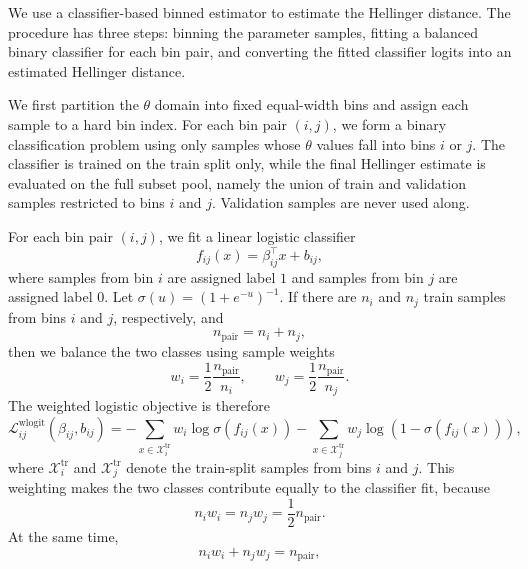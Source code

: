 We use a classifier-based binned estimator to estimate the Hellinger distance. The procedure has three steps: binning the parameter samples, fitting a balanced binary classifier for each bin pair, and converting the fitted classifier logits into an estimated Hellinger distance.

We first partition the $\theta$ domain into fixed equal-width bins and assign each sample to a hard bin index. For each bin pair $(i,j)$, we form a binary classification problem using only samples whose $\theta$ values fall into bins $i$ or $j$. The classifier is trained on the train split only, while the final Hellinger estimate is evaluated on the full subset pool, namely the union of train and validation samples restricted to bins $i$ and $j$. Validation samples are never used along.

For each bin pair $(i,j)$, we fit a linear logistic classifier
\begin{equation}
    f_{ij}(x)=\beta_{ij}^{\top}x+b_{ij},
\end{equation}
where samples from bin $i$ are assigned label $1$ and samples from bin $j$ are assigned label $0$. Let $\sigma(u)=(1+e^{-u})^{-1}$. If there are $n_i$ and $n_j$ train samples from bins $i$ and $j$, respectively, and
\begin{equation}
    n_{\mathrm{pair}}=n_i+n_j,
\end{equation}
then we balance the two classes using sample weights
\begin{equation}
    w_i=\frac{1}{2}\frac{n_{\mathrm{pair}}}{n_i},
    \qquad
    w_j=\frac{1}{2}\frac{n_{\mathrm{pair}}}{n_j}.
\end{equation}
The weighted logistic objective is therefore
\begin{equation}
\label{eq:implemented-weighted-logistic-loss}
    \mathcal{L}_{ij}^{\mathrm{wlogit}}(\beta_{ij},b_{ij})
    =
    -\sum_{x\in\mathcal{X}^{\mathrm{tr}}_i} w_i \log \sigma\!\left(f_{ij}(x)\right)
    -\sum_{x\in\mathcal{X}^{\mathrm{tr}}_j} w_j \log \!\left(1-\sigma\!\left(f_{ij}(x)\right)\right),
\end{equation}
where $\mathcal{X}^{\mathrm{tr}}_i$ and $\mathcal{X}^{\mathrm{tr}}_j$ denote the train-split samples from bins $i$ and $j$. This weighting makes the two classes contribute equally to the classifier fit, because
\begin{equation}
    n_iw_i=n_jw_j=\frac{1}{2}n_{\mathrm{pair}}.
\end{equation}
At the same time,
\begin{equation}
    n_iw_i+n_jw_j=n_{\mathrm{pair}},
\end{equation}

